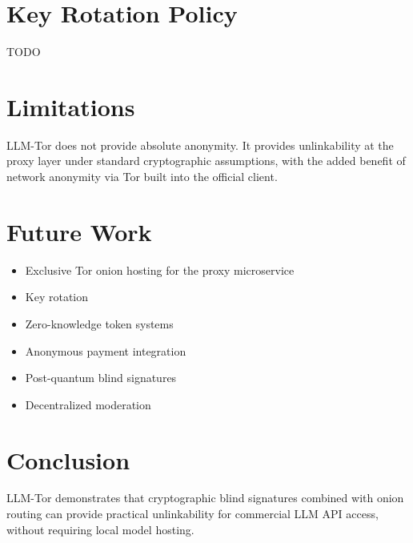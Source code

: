 \documentclass[11pt,a4paper]{article}
\begin{document}
\section{Key Rotation Policy}

TODO

\section{Limitations}

LLM-Tor does not provide absolute anonymity. It provides unlinkability at the proxy layer under standard
cryptographic assumptions, with the added benefit of network anonymity via Tor built into the official
client.

\section{Future Work}

\begin{itemize}
  \item Exclusive Tor onion hosting for the proxy microservice
  \item Key rotation
  \item Zero-knowledge token systems
  \item Anonymous payment integration
  \item Post-quantum blind signatures
  \item Decentralized moderation
\end{itemize}

\section{Conclusion}

LLM-Tor demonstrates that cryptographic blind signatures combined with onion routing can provide practical
unlinkability for commercial LLM API access, without requiring local model hosting.
\end{document}
